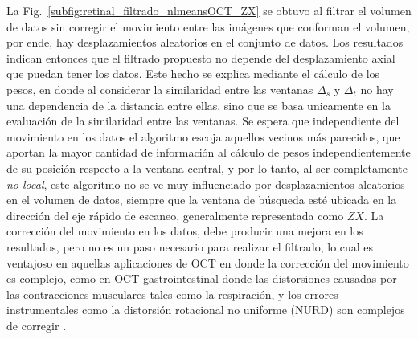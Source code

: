 La Fig.~\ref{subfig:retinal_filtrado_nlmeansOCT_ZX} se obtuvo al filtrar el volumen de datos sin corregir el movimiento entre las imágenes que conforman el volumen, por ende, hay desplazamientos aleatorios en el conjunto de datos. Los resultados indican entonces que el filtrado propuesto no depende del desplazamiento axial que puedan tener los datos. Este hecho se explica mediante el cálculo de los pesos, en donde al considerar la similaridad entre las ventanas $\Delta_s$ y $\Delta_t$ no hay una dependencia de la distancia entre ellas, sino que se basa unicamente en la evaluación de la similaridad entre las ventanas. Se espera que independiente del movimiento en los datos el algoritmo escoja aquellos vecinos más parecidos, que aportan la mayor cantidad de información al cálculo de pesos independientemente de su posición respecto a la ventana central, y por lo tanto, al ser completamente \emph{no local}, este algoritmo no se ve muy influenciado por desplazamientos aleatorios en el volumen de datos, siempre que la ventana de búsqueda esté ubicada en la dirección del eje rápido de escaneo, generalmente representada como $ZX$. La corrección del movimiento en los datos, debe producir una mejora en los resultados, pero no es un paso necesario para realizar el filtrado, lo cual es ventajoso en aquellas aplicaciones de OCT en donde la corrección del movimiento es complejo, como en OCT gastrointestinal donde las distorsiones causadas por las contracciones musculares tales como la respiración, y los errores instrumentales como la distorsión rotacional no uniforme (NURD) son complejos de corregir \cite{Liang2016, Uribe2015}. 

